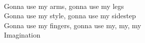\\
Gonna use my arms, gonna use my legs \\
Gonna use my style, gonna use my sidestep \\
Gonna use my fingers, gonna use my, my, my \\
Imagination \\
